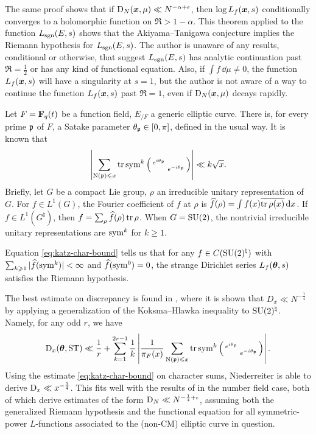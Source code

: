 The same proof shows that if $\operatorname{D}_N({\boldsymbol x},\mu)\ll N^{-\alpha+\epsilon}$, then 
$\log L_f({\boldsymbol x},s)$ conditionally converges to a holomorphic function on 
$\Re > 1 - \alpha$. This theorem applied to the function $L_{\operatorname{sgn}}(E,s)$ shows 
that the Akiyama--Tanigawa conjecture implies the Riemann hypothesis for 
$L_{\operatorname{sgn}}(E,s)$. The author is unaware of any results, conditional or 
otherwise, that suggest $L_{\operatorname{sgn}}(E,s)$ has analytic continuation past 
$\Re = \frac 1 2$ or has any kind of functional equation. Also, if 
$\int f\, \dd\mu \ne 0$, the function $L_f({\boldsymbol x},s)$ will have a singularity at 
$s = 1$, but the author is not aware of a way to continue the function 
$L_f({\boldsymbol x},s)$ past $\Re = 1$, even if $\operatorname{D}_N({\boldsymbol x},\mu)$ decays rapidly. 

Let $F = \mathbf{F}_q(t)$ be a function field, $E_{/F}$ a generic elliptic curve. 
There is, for every prime $\mathfrak{p}$ of $F$, a Satake parameter 
$\theta_{\mathfrak{p}} \in [0,\pi]$, defined in the usual way. It is known 
\cite[Ch.~3]{katz-1988} that
\begin{equation}\label{eq:katz-char-bound}
	\left|\sum_{\operatorname{N}(\mathfrak{p}) \leqslant x} \operatorname{tr}\operatorname{sym}^k\left(\begin{smallmatrix} e^{i \theta_{\mathfrak{p}}} &  \\  & e^{- i \theta_{\mathfrak{p}}} \end{smallmatrix}\right) \right| \ll k \sqrt{x} .
\end{equation}
Briefly, let $G$ be a compact Lie group, $\rho$ an irreducible unitary 
representation of $G$. For $f\in L^1(G)$, the Fourier coefficient of $f$ at 
$\rho$ is $\widehat f(\rho) = \int f(x) \overline{\operatorname{tr}\rho(x)}\, \mathrm{d} x$. If 
$f\in L^1(G^\natural)$, then $f = \sum_\rho \widehat f(\rho) \operatorname{tr} \rho$. When 
$G = \operatorname{SU}(2)$, the nontrivial irreducible unitary representations are 
$\operatorname{sym}^k$ for $k\geqslant 1$. 

Equation \eqref{eq:katz-char-bound} tells us that for any 
$f\in C(\operatorname{SU}(2)^\natural)$ with 
$\sum_{k\geqslant 1} |\widehat f(\operatorname{sym}^k)|<\infty$ and $\widehat f(\operatorname{sym}^0) = 0$, 
the strange Dirichlet series $L_f({\boldsymbol\theta},s)$ satisfies the Riemann hypothesis. 

The best estimate on discrepancy is found in 
\cite{niederreiter-1991}, where it is shown that $D_x \ll N^{-\frac 1 4}$ 
by applying a generalization of the Koksma--Hlawka inequality to 
$\operatorname{SU}(2)^\natural$. Namely, for any odd $r$, we have 
\[
	\operatorname{D}_x({\boldsymbol\theta},\mathrm{ST}) \ll \frac 1 r + \sum_{k=1}^{2 r -1} \frac 1 k \left| \frac{1}{\pi_F(x)} \sum_{\operatorname{N}(\mathfrak{p})\leqslant x} \operatorname{tr}\operatorname{sym}^k\left(\begin{smallmatrix} e^{i \theta_{\mathfrak{p}}} &  \\  & e^{- i \theta_{\mathfrak{p}}} \end{smallmatrix}\right)\right| .
\]
Using the estimate \eqref{eq:katz-char-bound} on character sums, Niederreiter 
is able to derive $\operatorname{D}_x \ll x^{-\frac 1 4}$. This fits well with the results of 
\cite{bucar-kedlaya-2015,rouse-thorner-2016} in the number field case, both of 
which derive estimates of the form $\operatorname{D}_N \ll N^{-\frac 1 4+\epsilon}$, assuming 
both the generalized Riemann hypothesis and the functional equation for all 
symmetric-power $L$-functions associated to the (non-CM) elliptic curve in 
question. 
